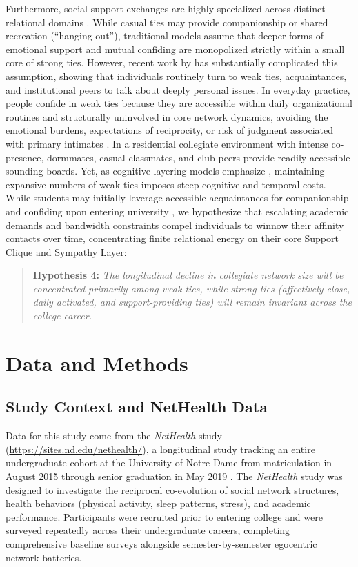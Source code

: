 \documentclass[12pt]{article}
\begin{document}
Furthermore, social support exchanges are highly specialized across distinct relational domains \citep{wellman1990different}. While casual ties may provide companionship or shared recreation (``hanging out''), traditional models assume that deeper forms of emotional support and mutual confiding are monopolized strictly within a small core of strong ties. However, recent work by \citet{small2017someone} has substantially complicated this assumption, showing that individuals routinely turn to weak ties, acquaintances, and institutional peers to talk about deeply personal issues. In everyday practice, people confide in weak ties because they are accessible within daily organizational routines and structurally uninvolved in core network dynamics, avoiding the emotional burdens, expectations of reciprocity, or risk of judgment associated with primary intimates \citep{small2017someone}. In a residential collegiate environment with intense co-presence, dormmates, casual classmates, and club peers provide readily accessible sounding boards. Yet, as cognitive layering models emphasize \citep{dunbar1992neocortex, dunbar2018anatomy}, maintaining expansive numbers of weak ties imposes steep cognitive and temporal costs. While students may initially leverage accessible acquaintances for companionship and confiding upon entering university \citep{small2017someone}, we hypothesize that escalating academic demands and bandwidth constraints compel individuals to winnow their affinity contacts over time, concentrating finite relational energy on their core Support Clique and Sympathy Layer:

\begin{quote}
\textbf{Hypothesis 4:} \emph{The longitudinal decline in collegiate network size will be concentrated primarily among weak ties, while strong ties (affectively close, daily activated, and support-providing ties) will remain invariant across the college career.}
\end{quote}

\section{Data and Methods}

\subsection{Study Context and NetHealth Data}

Data for this study come from the \emph{NetHealth} study (\url{https://sites.nd.edu/nethealth/}), a longitudinal study tracking an entire undergraduate cohort at the University of Notre Dame from matriculation in August 2015 through senior graduation in May 2019 \citep{liu2018network, sepulvado2020predicting, wang2020neither}. The \emph{NetHealth} study was designed to investigate the reciprocal co-evolution of social network structures, health behaviors (physical activity, sleep patterns, stress), and academic performance. Participants were recruited prior to entering college and were surveyed repeatedly across their undergraduate careers, completing comprehensive baseline surveys alongside semester-by-semester egocentric network batteries.
\end{document}
